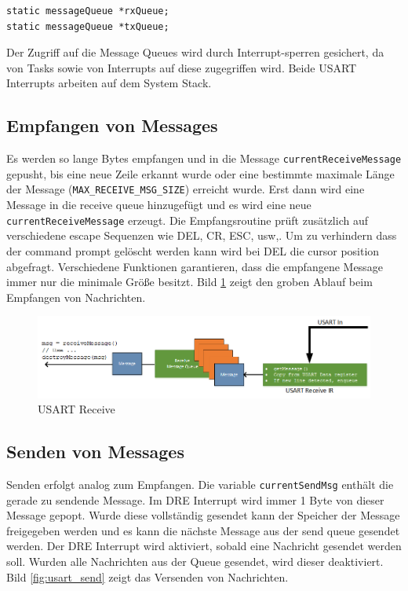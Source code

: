 \documentclass[fontsize=12pt, toc=bibliography, notitlepage]{scrreprt}
\begin{document}
\begin{lstlisting}
static messageQueue *rxQueue;
static messageQueue *txQueue;
\end{lstlisting}

Der Zugriff auf die Message Queues wird durch Interrupt-sperren gesichert, da von Tasks sowie von Interrupts auf diese zugegriffen wird. Beide USART Interrupts arbeiten auf dem System Stack.

\subsection{Empfangen von Messages}
Es werden so lange Bytes empfangen und in die Message \lstinline$currentReceiveMessage$ gepusht, bis eine neue Zeile erkannt wurde oder eine bestimmte maximale Länge der Message (\lstinline$MAX_RECEIVE_MSG_SIZE$) erreicht wurde. Erst dann wird eine Message in die receive queue hinzugefügt und es wird eine neue \lstinline$currentReceiveMessage$ erzeugt. Die Empfangsroutine prüft zusätzlich auf verschiedene escape Sequenzen wie DEL, CR, ESC, usw,. Um zu verhindern dass der command prompt gelöscht werden kann wird bei DEL die cursor position abgefragt. Verschiedene Funktionen garantieren, dass die empfangene Message immer nur die minimale Größe besitzt. Bild \ref{fig:usart_receive} zeigt den groben Ablauf beim Empfangen von Nachrichten.

\begin{figure}[H]
	\centering
	\includegraphics[width=450px]{images/UsartIn.png}
	\caption{USART Receive}
	\label{fig:usart_receive}
\end{figure}

\subsection{Senden von Messages}
Senden erfolgt analog zum Empfangen. Die variable \lstinline$currentSendMsg$ enthält die gerade zu sendende Message. Im DRE Interrupt wird immer 1 Byte von dieser Message gepopt. Wurde diese vollständig gesendet kann der Speicher der Message freigegeben werden und es kann die nächste Message aus der send queue gesendet werden. Der DRE Interrupt wird aktiviert, sobald eine Nachricht gesendet werden soll. Wurden alle Nachrichten aus der Queue gesendet, wird dieser deaktiviert. Bild \ref{fig:usart_send} zeigt das Versenden von Nachrichten.
\end{document}
